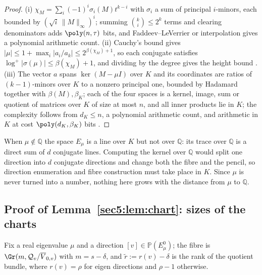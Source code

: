 \begin{proof}
(i) $\chi_M=\sum_i(-1)^{i}\sigma_i(M)t^{k-i}$ with $\sigma_i$ a sum of principal $i$-minors, each
bounded by $(\sqrt i\,\|M\|_\infty)^{i}$; summing $\binom ki\le2^{k}$ terms and clearing denominators
adds $\poly(n,\tau)$ bits, and Faddeev--LeVerrier or interpolation gives a polynomial arithmetic count.
(ii) Cauchy's bound gives $|\mu|\le1+\max_i|a_i/a_k|\le2^{\beta(\chi_M)+1}$, so each conjugate
satisfies $\log^{+}|\sigma(\mu)|\le\beta(\chi_M)+1$, and dividing by the degree gives the height bound
\cite{hj13}. (iii) The vector $a$ spans $\ker(M-\mu I)$ over $K$ and its coordinates are ratios of
$(k-1)$-minors over $K$ to a nonzero principal one, bounded by Hadamard together with
$\beta(M),\beta_K$; each of the four spaces is a kernel, image, sum or quotient of matrices over $K$
of size at most $n$, and all inner products lie in $K$; the complexity follows from $d_K\le n$, a
polynomial arithmetic count, and arithmetic in $K$ at cost $\poly(d_K,\beta_K)$ bits
\cite{lan02,vzgg03}.
\end{proof}

\begin{remark}\label{appBC:rem:mustK}
When $\mu\notin\mathbb{Q}$ the space $E_\mu$ is a line over $K$ but not over $\mathbb{Q}$: its trace
over $\mathbb{Q}$ is a direct sum of $d$ conjugate lines. Computing the kernel over $\mathbb{Q}$ would
split one direction into $d$ conjugate directions and change both the fibre and the pencil, so
direction enumeration and fibre construction must take place in $K$. Since $\mu$ is never turned into a
number, nothing here grows with the distance from $\mu$ to $\mathbb{Q}$.
\end{remark}

\subsection{Proof of Lemma~\ref{sec5:lem:chart}: sizes of the charts}\label{appBC:sub:chart}

Fix a real eigenvalue $\mu$ and a direction $[v]\in\mathbb{P}(E_\mu^0)$; the fibre is
$\Gr(m,\mathcal{Q}_v/\overline{V}_{0,v})$ with $m=s-\delta$, and $\widetilde r:=r(v)-\delta$ is the
rank of the quotient bundle, where $r(v)=\rho$ for eigen directions and $\rho-1$ otherwise.

